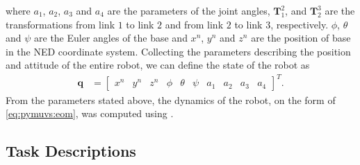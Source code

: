where $a_1$, $a_2$, $a_3$ and $a_4$ are the parameters of the joint angles,
$\bm{T}_1^2$, and $\bm{T}_2^3$ are the transformations from link $1$ to link $2$
and from link $2$ to link $3$, respectively. $\phi$, $\theta$ and $\psi$ are the
Euler angles of the base and $x^n$, $y^n$ and $z^n$ are the position of base
in the NED coordinate system. Collecting the parameters describing the position
and attitude of the entire robot, we can define the state of the robot as
\begin{align}
    \bm{q} &= \begin{bmatrix} x^n & y^n & z^n & \phi & \theta & \psi & a_1 & a_2 & a_3 & a_4 \end{bmatrix}^T.
\end{align}
From the parameters stated above, the dynamics of the robot, on the form of
\autoref{eq:pymuvs:eom}, was computed using \pymuvs.

\subsection{Task Descriptions}

